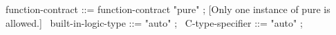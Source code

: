 \begin{syntax}
function-contract ::= function-contract "pure" ; [Only one instance of pure is allowed.] 
\
built-in-logic-type ::= "auto" ;
\
C-type-specifier ::= "auto" ;
\end{syntax}
